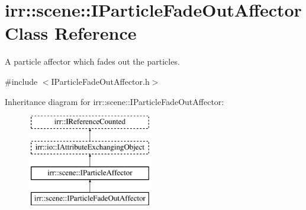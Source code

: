 \hypertarget{classirr_1_1scene_1_1IParticleFadeOutAffector}{}\section{irr\+:\+:scene\+:\+:I\+Particle\+Fade\+Out\+Affector Class Reference}
\label{classirr_1_1scene_1_1IParticleFadeOutAffector}


A particle affector which fades out the particles.  




{\ttfamily \#include $<$I\+Particle\+Fade\+Out\+Affector.\+h$>$}

Inheritance diagram for irr\+:\+:scene\+:\+:I\+Particle\+Fade\+Out\+Affector\+:\begin{figure}[H]
\begin{center}
\leavevmode
\includegraphics[height=4.000000cm]{classirr_1_1scene_1_1IParticleFadeOutAffector}
\end{center}
\end{figure}
